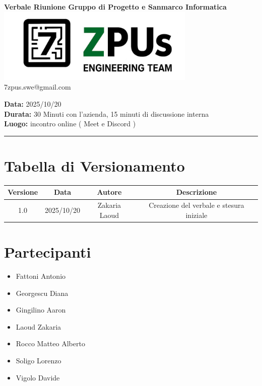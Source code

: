 \documentclass[a4paper,12pt]{article}
\begin{document}
\begin{center}
    \Large \textbf{Verbale Riunione Gruppo di Progetto e Sanmarco Informatica}\\
    \vspace{0.5cm}
    \includegraphics[width=9.5cm]{../../../images/logo7ZPUs2.jpg}
    \label{7zpus.swe@gmail.com}\\
    \small\hspace{10cm} 7zpus.swe@gmail.com
\end{center}


\noindent
\textbf{Data:} 2025/10/20 \\
\textbf{Durata:} 30 Minuti con l'azienda, 15 minuti di discussione interna \\
\textbf{Luogo:} incontro online ( Meet e Discord )

\vspace{0.3cm}
\hrule
\vspace{0.5cm}

\tableofcontents

\newpage

\section{Tabella di Versionamento}
    \begin{tabular}{|c|c|c|c|}
        \hline
        \textbf{Versione} & \textbf{Data} & \textbf{Autore} & \textbf{Descrizione} \\
        \hline
        1.0 & 2025/10/20 & Zakaria Laoud & Creazione del verbale e stesura iniziale \\

        \hline
    \end{tabular}


\section{Partecipanti}
\begin{itemize}[noitemsep]
    \item Fattoni Antonio 
    \item Georgescu Diana
    \item Gingilino Aaron
    \item Laoud Zakaria
    \item Rocco Matteo Alberto
    \item Soligo Lorenzo
    \item Vigolo Davide
\end{itemize}
\end{document}
